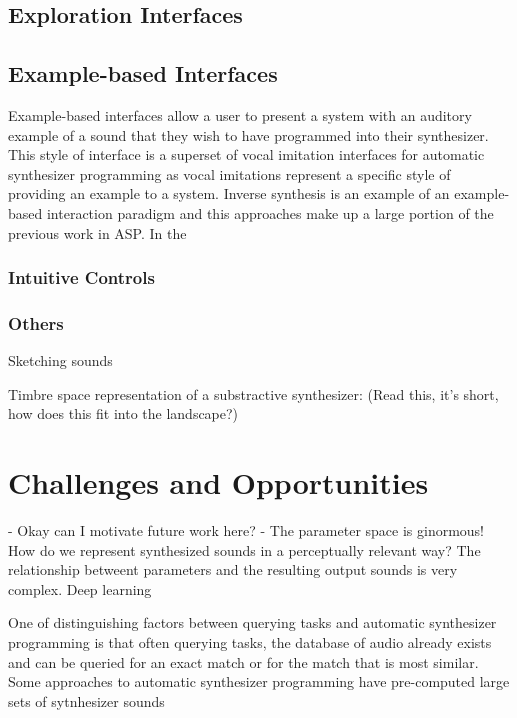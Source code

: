 \subsection{Exploration Interfaces}

\subsection{Example-based Interfaces}
Example-based interfaces allow a user to present a system with an auditory example of a sound that they wish to have programmed into their synthesizer. This style of interface is a superset of vocal imitation interfaces for automatic synthesizer programming as vocal imitations represent a specific style of providing an example to a system. Inverse synthesis is an example of an example-based interaction paradigm and this approaches make up a large portion of the previous work in ASP. In the 

\subsubsection{Intuitive Controls}


 \subsubsection{Others}
 Sketching sounds \cite{lobbers2021sketching} \cite{knees2016searching}
 
 Timbre space representation of a substractive synthesizer: \cite{vahidi2020timbre} (Read this, it's short, how does this fit into the landscape?)




\section{Challenges and Opportunities}
- Okay can I motivate future work here?
- The parameter space is ginormous! How do we represent synthesized sounds in a perceptually relevant way? The relationship betweent parameters and the resulting output sounds is very complex. Deep learning 

One of distinguishing factors between querying tasks and automatic synthesizer programming is that often querying tasks, the database of audio already exists and can be queried for an exact match or for the match that is most similar. Some approaches to automatic synthesizer programming have pre-computed large sets of sytnhesizer sounds 